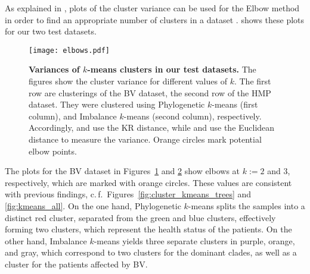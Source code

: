 As explained in ,
plots of the cluster variance can be used for the Elbow method
in order to find an appropriate number of clusters in a dataset \cite{Thorndike1953}.
 shows these plots for our two test datasets.

\begin{figure}[hpbt!]
    \centering
    \texttt{[image: elbows.pdf]}
    \begin{subfigure}{0pt}
        \label{fig:elbows:sub:bv_phylo}
    \end{subfigure}
    \begin{subfigure}{0pt}
        \label{fig:elbows:sub:bv_imb}
    \end{subfigure}
    \begin{subfigure}{0pt}
        \label{fig:elbows:sub:hmp_phylo}
    \end{subfigure}
    \begin{subfigure}{0pt}
        \label{fig:elbows:sub:hmp_imb}
    \end{subfigure}
    \caption[Variances of $k$-means clusters in our test datasets]{
        \textbf{Variances of $k$-means clusters in our test datasets.}
        The figures show the cluster variance for different values of $k$.
        The first row are clusterings of the BV dataset, the second row of the HMP dataset.
        They were clustered using Phylogenetic $k$-means (first column),
        and Imbalance $k$-means (second column), respectively.
        Accordingly,  and  use the KR distance,
        while  and  use the Euclidean distance
        to measure the variance.
        Orange circles mark potential elbow points.
    }
    \label{fig:elbows}
\end{figure}

The plots for the \ac{BV} dataset in Figures~\ref{fig:elbows:sub:bv_phylo} and \ref{fig:elbows:sub:bv_imb}
show elbows at $k:=2$ and $3$, respectively, which are marked with orange circles.
These values are consistent with previous findings, c.\,f.~Figures~\ref{fig:cluster_kmeans_trees} and \ref{fig:kmeans_all}.
On the one hand, Phylogenetic $k$-means splits the samples into a distinct red cluster,
separated from the green and blue clusters,
effectively forming two clusters, which represent the health status of the patients.
On the other hand, Imbalance $k$-means yields three separate clusters in purple, orange, and gray,
which correspond to two clusters for the dominant  clades,
as well as a cluster for the patients affected by \ac{BV}.

